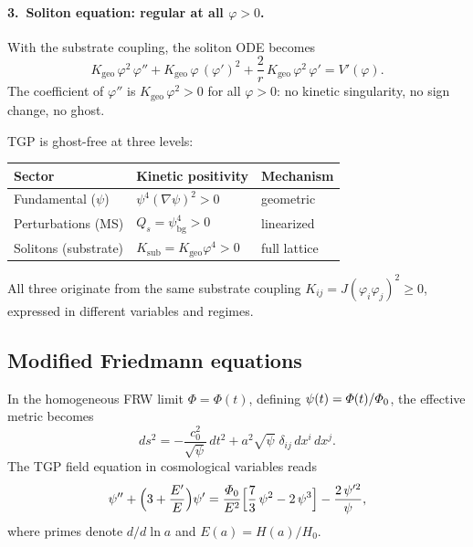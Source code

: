 \paragraph{3.\ Soliton equation: regular at all $\varphi>0$.}
With the substrate coupling, the soliton ODE becomes
\begin{equation}\label{eq:soliton-substrate}
  K_{\mathrm{geo}}\,\varphi^{2}\,\varphi''
  + K_{\mathrm{geo}}\,\varphi\,(\varphi')^{2}
  + \frac{2}{r}\,K_{\mathrm{geo}}\,\varphi^{2}\,\varphi'
  = V'(\varphi).
\end{equation}
The coefficient of $\varphi''$ is
$K_{\mathrm{geo}}\,\varphi^{2}>0$ for all $\varphi>0$:
no kinetic singularity, no sign change, no ghost.

\begin{remark}
TGP is ghost-free at three levels:
\begin{center}\small
\begin{tabular}{@{}lll@{}}
\toprule
\textbf{Sector} & \textbf{Kinetic positivity} & \textbf{Mechanism} \\
\midrule
Fundamental ($\psi$)   & $\psi^{4}(\nabla\psi)^{2}>0$
  & geometric \\
Perturbations (MS)     & $Q_{s}=\psi_{\mathrm{bg}}^{4}>0$
  & linearized \\
Solitons (substrate)   & $K_{\mathrm{sub}}=K_{\mathrm{geo}}\varphi^{4}>0$
  & full lattice \\
\bottomrule
\end{tabular}
\end{center}
All three originate from the same substrate coupling
$K_{ij}=J(\varphi_{i}\varphi_{j})^{2}\geq 0$, expressed in
different variables and regimes.
\end{remark}

\subsection{Modified Friedmann equations}\label{ssec:friedmann-en}

In the homogeneous FRW limit $\Phi=\Phi(t)$, defining
$\psi(t)=\varPhi(t)/\varPhi_0$, the effective metric becomes
\begin{equation}
  ds^{2} = -\frac{c_{0}^{2}}{\sqrt{\psi}}\,dt^{2}
         + a^{2}\sqrt{\psi}\;\delta_{ij}\,dx^{i}\,dx^{j}.
\end{equation}
The TGP field equation in cosmological variables reads
\begin{equation}\label{eq:psi-cosmo}
  \psi'' + \Bigl(3 + \frac{E'}{E}\Bigr)\psi'
  = \frac{\varPhi_0}{E^{2}}
    \Bigl[\frac{7}{3}\,\psi^{2} - 2\,\psi^{3}\Bigr]
  - \frac{2\,\psi'^{2}}{\psi},
\end{equation}
where primes denote $d/d\ln a$ and $E(a)=H(a)/H_{0}$.

